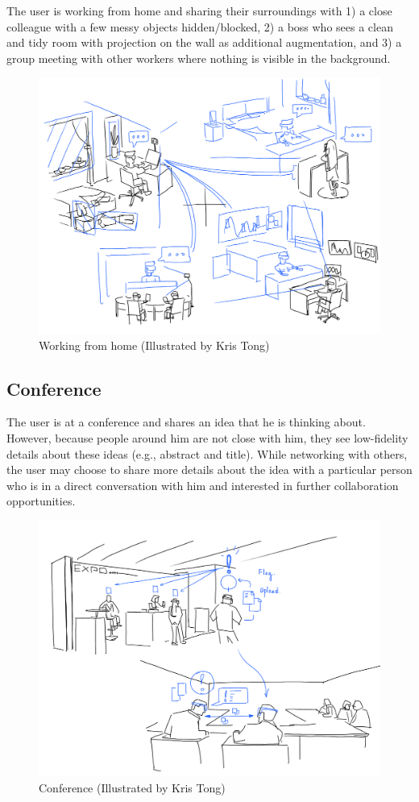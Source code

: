 The user is working from home and sharing their surroundings with 1) a close colleague with a few messy objects hidden/blocked, 2) a boss who sees a clean and tidy room with projection on the wall as additional augmentation, and 3) a group meeting with other workers where nothing is visible in the background. 
\begin{figure}[H]
    \centering
    \includegraphics[width=0.8\linewidth]{images/illustrations/2_Group_Meeting.png}
    \caption{Working from home (Illustrated by Kris Tong)}
    \label{fig:illustration:group-meeting}
\end{figure}

\subsection{Conference}

The user is at a conference and shares an idea that he is thinking about. However, because people around him are not close with him, they see low-fidelity details about these ideas (e.g., abstract and title). While networking with others, the user may choose to share more details about the idea  with a particular person who is in a direct conversation with him and interested in further collaboration opportunities.

\begin{figure}[H]
    \centering
    \includegraphics[width=0.8\linewidth]{images/illustrations/4_Flag_On_Conference.png}
    \caption{Conference (Illustrated by Kris Tong)}
    \label{fig:illustration:conference}
\end{figure}

